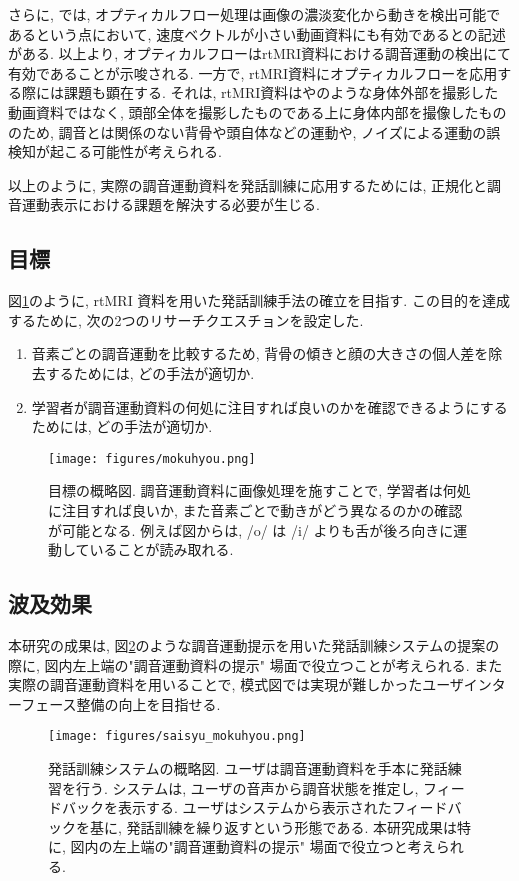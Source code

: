 さらに, \cite{opt_setsumei} では, オプティカルフロー処理は画像の濃淡変化から動きを検出可能であるという点において, 速度ベクトルが小さい動画資料にも有効であるとの記述がある.
以上より, オプティカルフローはrtMRI資料における調音運動の検出にて有効であることが示唆される.
一方で, rtMRI資料にオプティカルフローを応用する際には課題も顕在する. それは, rtMRI資料は\cite{opt_dokushin}や\cite{opt_face}のような身体外部を撮影した動画資料ではなく, 頭部全体を撮影したものである上に身体内部を撮像したもののため, 調音とは関係のない背骨や頭自体などの運動や, ノイズによる運動の誤検知が起こる可能性が考えられる.

以上のように, 実際の調音運動資料を発話訓練に応用するためには, 正規化と調音運動表示における課題を解決する必要が生じる.

\subsection{目標}\label{section_mokuhyou}
図\ref{mokuhyou}のように, rtMRI 資料を用いた発話訓練手法の確立を目指す.
この目的を達成するために, 次の2つのリサーチクエスチョンを設定した.

\begin{enumerate}
   \item 音素ごとの調音運動を比較するため, 背骨の傾きと顔の大きさの個人差を除去するためには, どの手法が適切か.
   \item 学習者が調音運動資料の何処に注目すれば良いのかを確認できるようにするためには, どの手法が適切か.
\end{enumerate}

\begin{figure}[hbtp]
 \centering
   \texttt{[image: figures/mokuhyou.png]}
 \caption[目標の概略図]{目標の概略図. 調音運動資料に画像処理を施すことで, 学習者は何処に注目すれば良いか, また音素ごとで動きがどう異なるのかの確認が可能となる. 例えば図からは, /o/ は /i/ よりも舌が後ろ向きに運動していることが読み取れる. }
 \label{mokuhyou}
\end{figure}

\subsection{波及効果}
本研究の成果は, 図\ref{siasyu_mokuhyou}のような調音運動提示を用いた発話訓練システムの提案の際に, 図内左上端の"調音運動資料の提示" 場面で役立つことが考えられる. また実際の調音運動資料を用いることで, 模式図では実現が難しかったユーザインターフェース整備の向上を目指せる.

\begin{figure}[hbtp]
 \centering
   \texttt{[image: figures/saisyu\_mokuhyou.png]}
 \caption[発話訓練システムの概略図]{発話訓練システムの概略図. ユーザは調音運動資料を手本に発話練習を行う. システムは, ユーザの音声から調音状態を推定し, フィードバックを表示する. ユーザはシステムから表示されたフィードバックを基に, 発話訓練を繰り返すという形態である. 本研究成果は特に, 図内の左上端の"調音運動資料の提示" 場面で役立つと考えられる. }
 \label{siasyu_mokuhyou}
\end{figure}